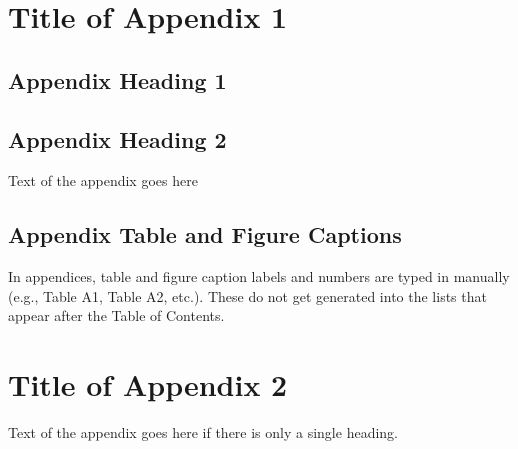 \chapter{Title of Appendix 1}
\label{ch:Title of Appendix 1}

\section{Appendix Heading 1}
\section{Appendix Heading 2}
Text of the appendix goes here

\section{Appendix Table and Figure Captions}
In appendices, table and figure caption labels and numbers are typed in manually (e.g., Table A1, Table A2, etc.). These do not get generated into the lists that appear after the Table of Contents. 

\chapter{Title of Appendix 2}
\label{ch:Title of Appendix 2}
Text of the appendix goes here if there is only a single heading. 